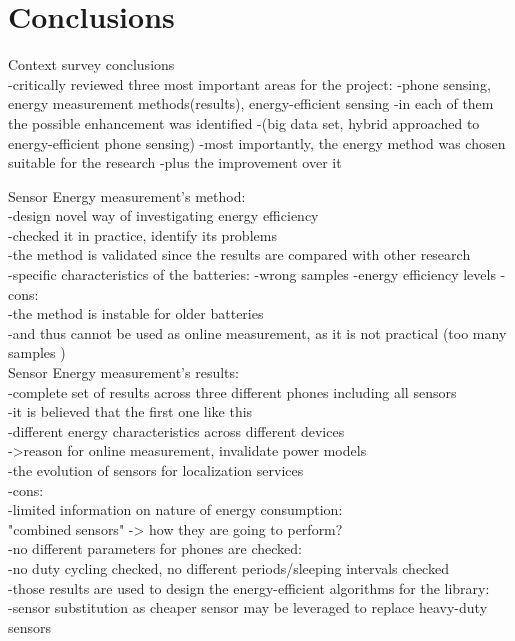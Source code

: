 \section{Conclusions}
\label{s:conc}
Context survey conclusions \\
	-critically reviewed three most important areas for the project:
		-phone sensing, energy measurement methods(results), energy-efficient sensing
	-in each of them the possible enhancement was identified
	-(big data set, hybrid approached to energy-efficient phone sensing)
	-most importantly, the energy method was chosen suitable for the research
		-plus the improvement over it

Sensor Energy measurement's method:\\
	-design novel way of investigating energy efficiency\\
	-checked it in practice, identify its problems\\
	-the method is validated since the results are compared with other research\\
	-specific characteristics of the batteries:
		-wrong samples
		-energy efficiency levels
	-cons:\\
		-the method is instable for older batteries \\
			-and thus cannot be used as online measurement, as it is not practical (too many samples )\\
	
	
Sensor Energy measurement's results:\\
	-complete set of results across three different phones including all sensors\\
		-it is believed that the first one like this\\
	-different energy characteristics across different devices\\
		->reason for online measurement, invalidate power models\\
	-the evolution of sensors for localization services\\
	-cons:\\
		-limited information on nature of energy consumption:\\
			"combined sensors" -> how they are going to perform?\\
			-no different parameters for phones are checked:\\
				-no duty cycling checked, no different periods/sleeping intervals checked\\
	-those results are used to design the energy-efficient algorithms for the library:\\
		-sensor substitution as cheaper sensor may be leveraged to replace heavy-duty sensors\\
	
